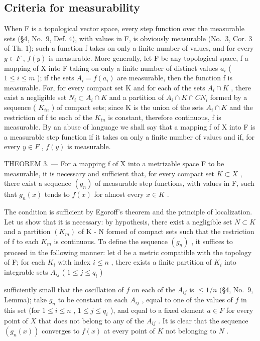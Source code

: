 \subsection{Criteria for measurability}

When F is a topological vector space, every step function over the measurable sets (§4, No.~9, Def. 4), with values in F, is obviously measurable (No.~3, Cor. 3 of Th. 1); such a function f takes on only a finite number of values, and for every \(y \in F\) , \(f(y)\) is measurable. More generally, let F be any topological space, f a mapping of X into F taking on only a finite number of distinct values \(a_i\) ( \(1 \leqslant i \leqslant m\) ); if the sets \(A_i = f(a_i)\) are measurable, then the function f is measurable. For, for every compact set K and for each of the sets \(A_i \cap K\) , there exist a negligible set \(N_i \subset A_i \cap K\) and a partition of \(A_i \cap K \cap C N_i\) formed by a sequence ( \(K_{in}\) ) of compact sets; since K is the union of the sets \(A_i \cap K\) and the restriction of f to each of the \(K_{in}\) is constant, therefore continuous, f is measurable. By an abuse of language we shall say that a mapping f of X into F is a measurable step function if it takes on only a finite number of values and if, for every \(y \in F\) , \(f(y)\) is measurable.

THEOREM 3. --- For a mapping f of X into a metrizable space F to be measurable, it is necessary and sufficient that, for every compact set \(K \subset X\) , there exist a sequence \((g_{n})\) of measurable step functions, with values in F, such that \(g_{n}(x)\) tends to \(f(x)\) for almost every \(x \in K\) .

The condition is sufficient by Egoroff's theorem and the principle of localization. Let us show that it is necessary: by hypothesis, there exist a negligible set \(N \subset K\) and a partition \((K_{m})\) of K - N formed of compact sets such that the restriction of f to each \(K_{m}\) is continuous. To define the sequence \((g_{n})\) , it suffices to proceed in the following manner: let d be a metric compatible with the topology of F; for each \(K_{i}\) with index \(i \leqslant n\) , there exists a finite partition of \(K_{i}\) into integrable sets \(A_{ij}\) ( \(1 \leqslant j \leqslant q_{i}\) )

sufficiently small that the oscillation of \(f\) on each of the \(A_{ij}\) is \(\leqslant 1/n\) (§4, No.~9, Lemma); take \(g_n\) to be constant on each \(A_{ij}\) , equal to one of the values of \(f\) in this set (for \(1 \leqslant i \leqslant n\) , \(1 \leqslant j \leqslant q_i\) ), and equal to a fixed element \(a \in F\) for every point of \(X\) that does not belong to any of the \(A_{ij}\) . It is clear that the sequence \((g_n(x))\) converges to \(f(x)\) at every point of \(K\) not belonging to \(N\) .

